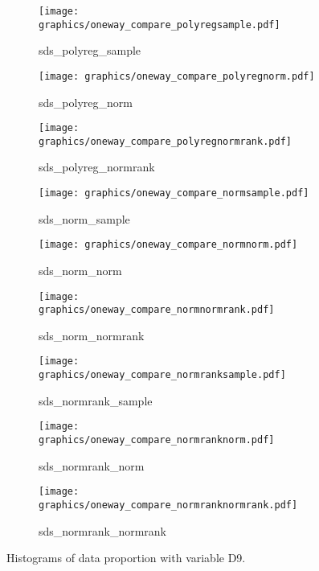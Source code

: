 \newpage
\begin{figure}[H]\ContinuedFloat
    \begin{subfigure}{0.32\textwidth}
        \centering
        \texttt{[image: graphics/oneway\_compare\_polyregsample.pdf]}  
        \caption{sds\_polyreg\_sample}
        \label{subfig:polyregsampleD9}
    \end{subfigure}
    \begin{subfigure}{0.32\textwidth}
        \centering
        \texttt{[image: graphics/oneway\_compare\_polyregnorm.pdf]}  
        \caption{sds\_polyreg\_norm}
        \label{subfig:polyregnormD9}
    \end{subfigure}
    \begin{subfigure}{0.32\textwidth}
        \centering
        \texttt{[image: graphics/oneway\_compare\_polyregnormrank.pdf]}  
        \caption{sds\_polyreg\_normrank}
        \label{subfig:polyregnormrankD9}
    \end{subfigure}
    \medskip
    \begin{subfigure}{0.32\textwidth}
        \centering
        \texttt{[image: graphics/oneway\_compare\_normsample.pdf]}  
        \caption{sds\_norm\_sample}
        \label{subfig:normsampleD9}
    \end{subfigure}
    \begin{subfigure}{0.32\textwidth}
        \centering
        \texttt{[image: graphics/oneway\_compare\_normnorm.pdf]}  
        \caption{sds\_norm\_norm}
        \label{subfig:normnormD9}
    \end{subfigure}
    \begin{subfigure}{0.32\textwidth}
        \centering
        \texttt{[image: graphics/oneway\_compare\_normnormrank.pdf]}  
        \caption{sds\_norm\_normrank}
        \label{subfig:normnormrankD9}
    \end{subfigure}
    \medskip
    \begin{subfigure}{0.32\textwidth}
        \centering
        \texttt{[image: graphics/oneway\_compare\_normranksample.pdf]}  
        \caption{sds\_normrank\_sample}
        \label{subfig:normranksampleD9}
    \end{subfigure}
    \begin{subfigure}{0.32\textwidth}
        \centering
        \texttt{[image: graphics/oneway\_compare\_normranknorm.pdf]}  
        \caption{sds\_normrank\_norm}
        \label{subfig:normranknormD9}
    \end{subfigure}
    \begin{subfigure}{0.32\textwidth}
        \centering
        \texttt{[image: graphics/oneway\_compare\_normranknormrank.pdf]}  
        \caption{sds\_normrank\_normrank}
        \label{subfig:normranknormrankD9}
    \end{subfigure}
    \caption[]{Histograms of data proportion with variable D9.}
    \label{fig:D9-2}
\end{figure}

